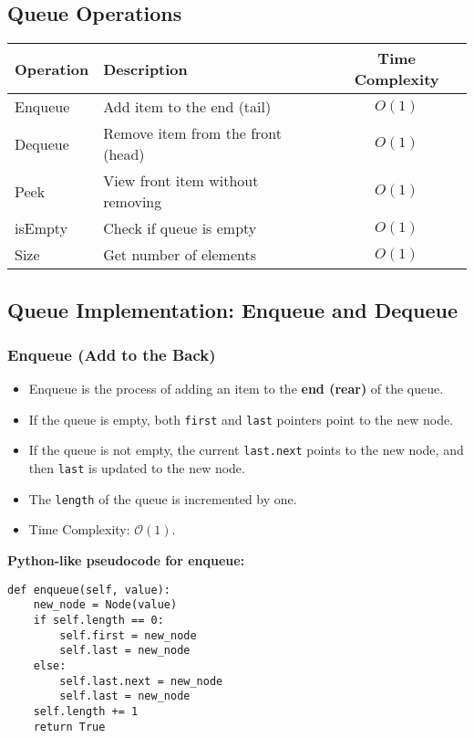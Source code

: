 \subsection{Queue Operations}

\begin{center}
\begin{tabular}{|l|l|c|}
\hline
\textbf{Operation} & \textbf{Description} & \textbf{Time Complexity} \\
\hline
Enqueue & Add item to the end (tail) & $O(1)$ \\
Dequeue & Remove item from the front (head) & $O(1)$ \\
Peek    & View front item without removing & $O(1)$ \\
isEmpty & Check if queue is empty & $O(1)$ \\
Size    & Get number of elements & $O(1)$ \\
\hline
\end{tabular}
\end{center}

\subsection{Queue Implementation: Enqueue and Dequeue}

\subsubsection*{Enqueue (Add to the Back)}

\begin{itemize}
    \item Enqueue is the process of adding an item to the \textbf{end (rear)} of the queue.
    \item If the queue is empty, both \texttt{first} and \texttt{last} pointers point to the new node.
    \item If the queue is not empty, the current \texttt{last.next} points to the new node, and then \texttt{last} is updated to the new node.
    \item The \texttt{length} of the queue is incremented by one.
    \item Time Complexity: $\mathcal{O}(1)$.
\end{itemize}

\textbf{Python-like pseudocode for enqueue:}
\begin{verbatim}
def enqueue(self, value):
    new_node = Node(value)
    if self.length == 0:
        self.first = new_node
        self.last = new_node
    else:
        self.last.next = new_node
        self.last = new_node
    self.length += 1
    return True
\end{verbatim}

